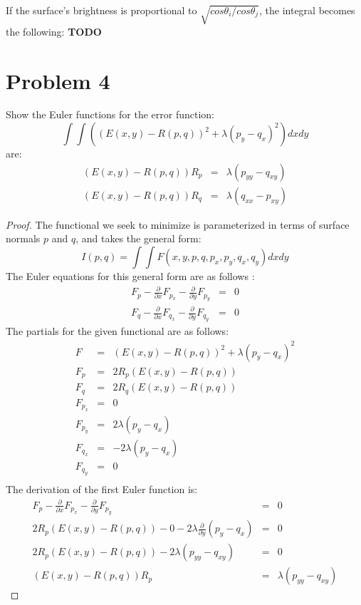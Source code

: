 \documentclass[letter,11pt]{article}
\begin{document}
{If the surface's brightness is proportional to $\sqrt{cos \theta_i/cos\theta_j}$, the integral becomes the following: \textbf{TODO}

\section*{Problem 4}
{
Show the Euler functions for the error function:
$$\int\int\left((E(x,y) - R(p,q))^2 + \lambda(p_y - q_x)^2\right)dxdy$$
are:
\begin{eqnarray*}
	(E(x,y) - R(p,q))R_p &=& \lambda(p_{yy}-q_{xy})\\
	(E(x,y) - R(p,q))R_q &=& \lambda(q_{xx}-p_{xy}) 
\end{eqnarray*}
\begin{proof}
The functional we seek to minimize is parameterized in terms of surface normals $p$ and $q$, and takes the general form:
$$I(p,q) = \int\int F(x,y,p,q,p_x,p_y,q_x,q_y)dxdy$$
The Euler equations for this general form are as follows \cite{horn1986}:
\begin{eqnarray*}
	F_p - \frac{\partial}{\partial x}F_{p_x}-\frac{\partial}{\partial y}F_{p_y} &=& 0 \\
	F_q - \frac{\partial}{\partial x}F_{q_x}-\frac{\partial}{\partial y}F_{q_y} &=& 0 
\end{eqnarray*}
The partials for the given functional are as follows:
\begin{eqnarray*}
	F &=& (E(x,y) - R(p,q))^2 + \lambda(p_y - q_x)^2\\
	F_p &=& 2R_p(E(x,y)-R(p,q)) \\
	F_q &=& 2R_q(E(x,y)-R(p,q)) \\
	F_{p_x} &=& 0 \\
	F_{p_y} &=& 2\lambda(p_y-q_x) \\
	F_{q_x} &=& -2\lambda(p_y-q_x) \\
	F_{q_y} &=& 0 \\
\end{eqnarray*}
The derivation of the first Euler function is:
\begin{eqnarray*}
    F_p - \frac{\partial}{\partial x}F_{p_x}-\frac{\partial}{\partial y}F_{p_y} &=& 0 \\
	2R_p(E(x,y)-R(p,q)) - 0 - 2\lambda\frac{\partial}{\partial y}(p_y-q_x) &=& 0 \\
	2R_p(E(x,y)-R(p,q)) - 2\lambda(p_{yy}-q_{xy}) &=& 0 \\
	(E(x,y)-R(p,q))R_p &=& \lambda(p_{yy}-q_{xy})

\end{eqnarray*}
\end{proof}}}
\end{document}
